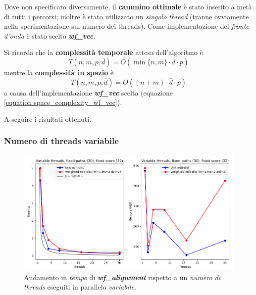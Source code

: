     Dove non specificato diversamente, il \textbf{cammino ottimale} è stato inserito a metà di tutti i percorsi; inoltre è stato utilizzato un \emph{singolo thread} (tranne ovviamente nella sperimentazione sul numero dei threads). Come implementazione del \emph{fronte d'onda} è stato scelto \textbf{\textit{wf\_vec}}. 
    
    Si ricorda che la \textbf{complessità temporale} attesa dell'algoritmo è
    \begin{equation}
        T(n, m, p, \overline{d}) = O(\min\{n, m\} \cdot \overline{d} \cdot p)
        \label{equation:wf_time_complexity_benchmark}
    \end{equation}
    mentre la \textbf{complessità in spazio} è
    \begin{equation}
        T(n, m, p, \overline{d}) = O((n+m) \cdot \overline{d} \cdot p)
        \label{equation:wf_space_complexity_benchmark}
    \end{equation}
    a causa dell'implementazione \textbf{\textit{wf\_vec}} scelta (equazione \ref{equation:space_complexity_wf_vec}).

    \vspace{20pt}
    A seguire i risultati ottenuti.

\subsubsection{Numero di threads variabile}
     \begin{figure}[h]
        \centering
        \includegraphics[width=1.0\linewidth]{images/benchmark_threads_variable.png} 
         \caption[Andamento con threads variabili]{Andamento in \emph{tempo} di \textbf{\textit{wf\_alignment}} rispetto a un \emph{numero di threads} eseguiti in parallelo \emph{variabile}.}
        \label{fig:benchmark_threads}
    \end{figure}
    \vspace{20pt}

